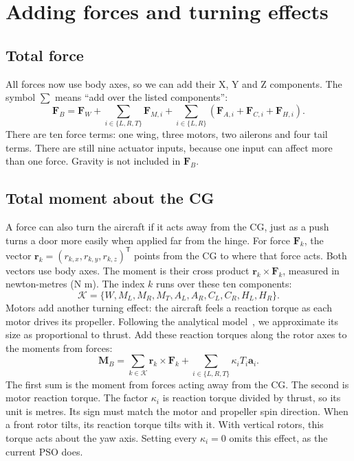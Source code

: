\documentclass[11pt,a4paper]{article}
\numberwithin{equation}{section}
\newcommand{\vect}[1]{\boldsymbol{#1}}
\newcommand{\trans}{^{\mathsf T}}
\begin{document}
\section{Adding forces and turning effects}
\subsection{Total force}
All forces now use body axes, so we can add their X, Y and Z components.
The symbol $\sum$ means ``add over the listed components'':
\begin{equation}\label{eq:force-sum}
 \vect F_B=\vect F_W+
 \sum_{i\in\{L,R,T\}}\vect F_{M,i}+
 \sum_{i\in\{L,R\}}
 \left(\vect F_{A,i}+\vect F_{C,i}+\vect F_{H,i}\right).
\end{equation}
There are ten force terms: one wing, three motors, two ailerons and four
tail terms. There are still nine actuator inputs, because one input can
affect more than one force. Gravity is not included in $\vect F_B$.

\subsection{Total moment about the CG}
A force can also turn the aircraft if it acts away from the CG, just as a
push turns a door more easily when applied far from the hinge.
For force $\vect F_k$, the vector
$\vect r_k=(r_{k,x},r_{k,y},r_{k,z})\trans$ points from the CG to where
that force acts. Both vectors use body axes. The moment is their cross
product $\vect r_k\times\vect F_k$, measured in newton-metres (N m).
The index $k$ runs over these ten components:
\begin{equation}
 \mathcal K=\{W,M_L,M_R,M_T,A_L,A_R,C_L,C_R,H_L,H_R\}.
\end{equation}
Motors add another turning effect: the aircraft feels a reaction torque
as each motor drives its propeller. Following the analytical
model~\cite{analytical}, we approximate its size as proportional to thrust.
Add these reaction torques along the rotor axes to the moments from forces:
\begin{equation}\label{eq:moment-sum}
 \vect M_B=\sum_{k\in\mathcal K}\vect r_k\times\vect F_k+
 \sum_{i\in\{L,R,T\}}\kappa_i T_i\vect a_i.
\end{equation}
The first sum is the moment from forces acting away from the CG. The second
is motor reaction torque. The factor $\kappa_i$ is reaction torque divided
by thrust, so its unit is metres. Its sign must match the motor and
propeller spin direction. When a front rotor tilts, its reaction torque
tilts with it. With vertical rotors, this torque acts about the yaw axis.
Setting every $\kappa_i=0$ omits this effect, as the current PSO does.
\end{document}
